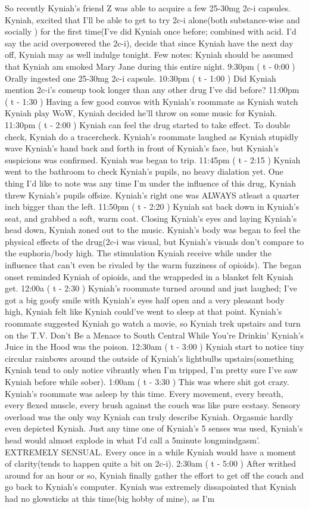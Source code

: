 \documentclass[12pt]{book}
\begin{document}
So recently Kyniah's friend Z was able to acquire a few 25-30mg 2c-i capsules. Kyniah, excited that I'll be able to get to try 2c-i alone(both substance-wise and socially ) for the first time(I've did Kyniah once before; combined with acid. I'd say the acid overpowered the 2c-i), decide that since Kyniah have the next day off, Kyniah may as well indulge tonight. Few notes: Kyniah should be assumed that Kyniah am smoked Mary Jane during this entire night. 9:30pm ( t - 0:00 ) Orally ingested one 25-30mg 2c-i capsule. 10:30pm ( t - 1:00 ) Did Kyniah mention 2c-i's comeup took longer than any other drug I've did before? 11:00pm ( t - 1:30 ) Having a few good convos with Kyniah's roommate as Kyniah watch Kyniah play WoW, Kyniah decided he'll throw on some music for Kyniah. 11:30pm ( t - 2:00 ) Kyniah can feel the drug started to take effect. To double check, Kyniah do a tracercheck. Kyniah's roommate laughed as Kyniah stupidly wave Kyniah's hand back and forth in front of Kyniah's face, but Kyniah's suspicions was confirmed. Kyniah was began to trip. 11:45pm ( t - 2:15 ) Kyniah went to the bathroom to check Kyniah's pupils, no heavy dialation yet. One thing I'd like to note was any time I'm under the influence of this drug, Kyniah threw Kyniah's pupils offsize. Kyniah's right one was ALWAYS atleast a quarter inch bigger than the left. 11:50pm ( t - 2:20 ) Kyniah sat back down in Kyniah's seat, and grabbed a soft, warm coat. Closing Kyniah's eyes and laying Kyniah's head down, Kyniah zoned out to the music. Kyniah's body was began to feel the physical effects of the drug(2c-i was visual, but Kyniah's visuals don't compare to the euphoria/body high. The stimulation Kyniah receive while under the influence that can't even be rivaled by the warm fuzziness of opioids). The began onset reminded Kyniah of opioids, and the wrappeded in a blanket felt Kyniah get. 12:00a ( t - 2:30 ) Kyniah's roommate turned around and just laughed; I've got a big goofy smile with Kyniah's eyes half open and a very pleasant body high, Kyniah felt like Kyniah could've went to sleep at that point. Kyniah's roommate suggested Kyniah go watch a movie, so Kyniah trek upstairs and turn on the T.V. Don't Be a Menace to South Central While You're Drinkin' Kyniah's Juice in the Hood was the poison. 12:30am ( t - 3:00 ) Kyniah start to notice tiny circular rainbows around the outside of Kyniah's lightbulbs upstairs(something Kyniah tend to only notice vibrantly when I'm tripped, I'm pretty sure I've saw Kyniah before while sober). 1:00am ( t - 3:30 ) This was where shit got crazy. Kyniah's roommate was asleep by this time. Every movement, every breath, every flexed muscle, every brush against the couch was like pure ecstasy. Sensory overload was the only way Kyniah can truly describe Kyniah. Orgasmic hardly even depicted Kyniah. Just any time one of Kyniah's 5 senses was used, Kyniah's head would almost explode in what I'd call a 5minute longmindgasm'. EXTREMELY SENSUAL. Every once in a while Kyniah would have a moment of clarity(tends to happen quite a bit on 2c-i). 2:30am ( t - 5:00 ) After writhed around for an hour or so, Kyniah finally gather the effort to get off the couch and go back to Kyniah's computer. Kyniah was extremely dissapointed that Kyniah had no glowsticks at this time(big hobby of mine), as I'm 
\end{document}
